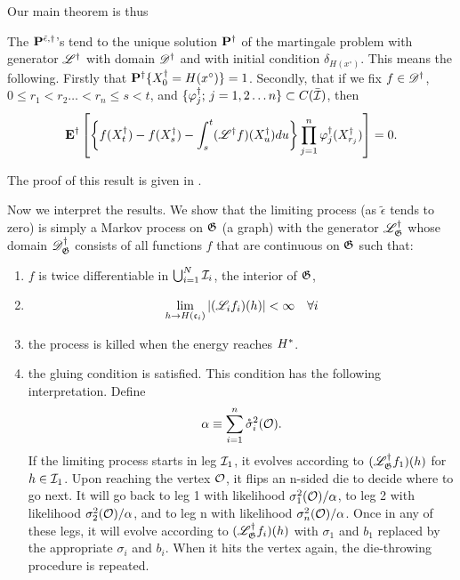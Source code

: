 Our main theorem is thus
\begin{theorem}\label{T:main}
  The $\mathbf P^{\tilde\epsilon,\dagger}$'s tend to the unique solution $\mathbf P^\dagger$ of the martingale problem with generator $\mathscr L^\dagger$ with domain $\mathscr D^\dagger$ and with initial condition $\delta_{H(x^\circ)}$. This means the following. Firstly that $\mathbf P^\dagger\{X^\dagger_0=H(x^\circ)\}=1$. Secondly, that if we fix $f\in \mathscr D^\dagger$, $0\le r_1<r_2\dots <r_n\le s<t$, and $\{\varphi^\dagger_j;\, j=1,2\dots n\}\subset C(\bar {\mathcal I})$, then
\[
\operatorname{\mathbf E}^\dagger\left[\left\{f(X^\dagger_t)-f(X^\dagger_s)-\int_s^t (\mathscr L^\dagger f)(X^\dagger_u)du\right\}\prod_{j=1}^n\varphi^\dagger_j(X^\dagger_{r_j})\right]=0.
\]
\end{theorem}
The proof of this result is given in \citet{namachchivaya01:_unified_approac_noisy_nonlin_mathieu_type_system}.
\begin{remark} Now we interpret the results. We show that the limiting process (as $\tilde\epsilon$ tends to zero) is simply a Markov process on $\mathfrak G$ (a graph) with the generator $\mathscr L^\dagger_\mathfrak G$ whose domain  $\mathscr D^\dagger_\mathfrak G$ consists of all functions $f$ that are continuous on $\mathfrak G$ such that:
\begin{enumerate}
\item $f$ is twice differentiable in $\bigcup_{i=1}^N  \mathcal I_i$, the interior of $\mathfrak G$,
\item
\[
\lim_{h \to H(\mathfrak c_i)}|(\mathscr L_i f_i)(h)| < \infty \quad \forall i
\]
\item the process is killed when the energy reaches $H^*$.
\item the gluing condition is satisfied. This condition has the following interpretation. Define
\[
\alpha \equiv \sum_{i=1}^n \mathring{\sigma}_{i}^2({\mathcal O}).
\]
If the limiting process starts in leg $\mathcal I_1$, it evolves according to $(\mathscr L^\dagger_\mathfrak G f_1)(h)$ for $h\in \mathcal I_1$. Upon reaching the vertex ${\mathcal O}$, it flips an n-sided die to decide where to go next. It will go back to leg 1 with likelihood $\sigma_{1}^2({\mathcal O})/\alpha$, to leg 2 with likelihood $\sigma_{2}^2({\mathcal O})/\alpha$, and to leg n with likelihood $\sigma_{n}^2({\mathcal O})/\alpha$. Once in any of these legs, it will evolve according to $(\mathscr L^\dagger_\mathfrak G f_i)(h)$ with $\sigma_1$ and $b_1$ replaced by the appropriate $\sigma_i$ and $b_i$. When it hits the vertex again, the die-throwing procedure is repeated.
\end{enumerate}
\end{remark}

